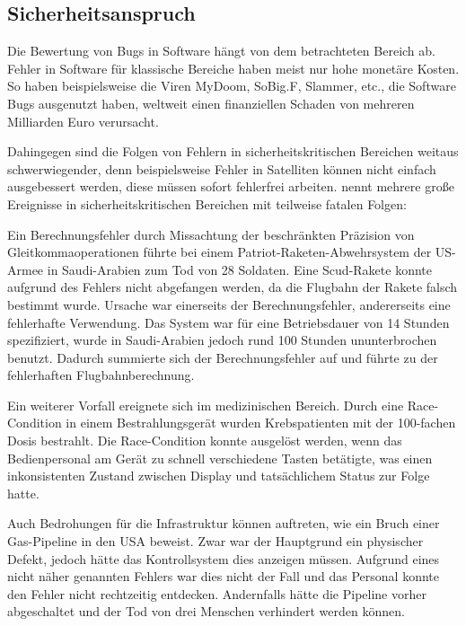\subsection{Sicherheitsanspruch} %

Die Bewertung von Bugs in Software hängt von dem betrachteten Bereich ab.
Fehler in Software für klassische Bereiche haben meist nur hohe monetäre Kosten.
So haben beispielsweise die Viren MyDoom, SoBig.F, Slammer, etc., die Software Bugs ausgenutzt haben, weltweit einen finanziellen Schaden von mehreren Milliarden Euro verursacht. \parencite[Vgl.][]{ComputerEconomics2004aa}

Dahingegen sind die Folgen von Fehlern in sicherheitskritischen Bereichen weitaus schwerwiegender, denn beispielsweise Fehler in Satelliten können nicht einfach ausgebessert werden, diese müssen sofort fehlerfrei arbeiten.
\parencite[][]{Zhivich:2009aa} nennt mehrere große Ereignisse in sicherheitskritischen Bereichen mit teilweise fatalen Folgen:

Ein Berechnungsfehler durch Missachtung der beschränkten Präzision von Gleitkommaoperationen führte bei einem Patriot-Raketen-Abwehrsystem der US-Armee in Saudi-Arabien zum Tod von 28 Soldaten.
Eine Scud-Rakete konnte aufgrund des Fehlers nicht abgefangen werden, da die Flugbahn der Rakete falsch bestimmt wurde.
Ursache war einerseits der Berechnungsfehler, andererseits eine fehlerhafte Verwendung.
Das System war für eine Betriebsdauer von 14 Stunden spezifiziert, wurde in Saudi-Arabien jedoch rund 100 Stunden ununterbrochen benutzt.
Dadurch summierte sich der Berechnungsfehler auf und führte zu der fehlerhaften Flugbahnberechnung.

Ein weiterer Vorfall ereignete sich im medizinischen Bereich.
Durch eine Race-Condition in einem Bestrahlungsgerät wurden Krebspatienten mit der 100-fachen Dosis bestrahlt.
Die Race-Condition konnte ausgelöst werden, wenn das Bedienpersonal am Gerät zu schnell verschiedene Tasten betätigte, was einen inkonsistenten Zustand zwischen Display und tatsächlichem Status zur Folge hatte.

Auch Bedrohungen für die Infrastruktur können auftreten, wie ein Bruch einer Gas-Pipeline in den USA beweist.
Zwar war der Hauptgrund ein physischer Defekt, jedoch hätte das Kontrollsystem dies anzeigen müssen.
Aufgrund eines nicht näher genannten Fehlers war dies nicht der Fall und das Personal konnte den Fehler nicht rechtzeitig entdecken.
Andernfalls hätte die Pipeline vorher abgeschaltet und der Tod von drei Menschen verhindert werden können.

